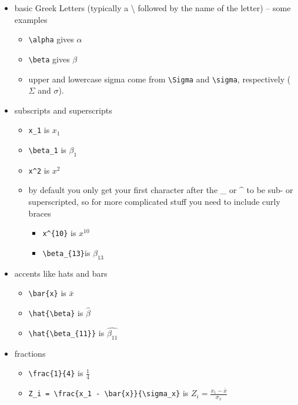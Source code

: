 \documentclass[
  letterpaper,
]{book}
\providecommand{\tightlist}{%
  \setlength{\itemsep}{0pt}\setlength{\parskip}{0pt}}\usepackage{longtable,booktabs,array}
\begin{document}
\begin{itemize}
\tightlist
\item
  basic Greek Letters (typically a \textbackslash{} followed by the name
  of the letter) -- some examples

  \begin{itemize}
  \tightlist
  \item
    \texttt{\textbackslash{}alpha} gives \(\alpha\)
  \item
    \texttt{\textbackslash{}beta} gives \(\beta\)
  \item
    upper and lowercase sigma come from \texttt{\textbackslash{}Sigma}
    and \texttt{\textbackslash{}sigma}, respectively (\(\Sigma\) and
    \(\sigma\)).
  \end{itemize}
\item
  subscripts and superscripts

  \begin{itemize}
  \tightlist
  \item
    \texttt{x\_1} is \(x_1\)
  \item
    \texttt{\textbackslash{}beta\_1} is \(\beta_1\)
  \item
    \texttt{x\^{}2} is \(x^2\)
  \item
    by default you only get your first character after the \_ or \^{} to
    be sub- or superscripted, so for more complicated stuff you need to
    include curly braces

    \begin{itemize}
    \tightlist
    \item
      \texttt{x\^{}\{10\}} is \(x^{10}\)
    \item
      \texttt{\textbackslash{}beta\_\{13\}}is \(\beta_{13}\)
    \end{itemize}
  \end{itemize}
\item
  accents like hats and bars

  \begin{itemize}
  \tightlist
  \item
    \texttt{\textbackslash{}bar\{x\}} is \(\bar{x}\)
  \item
    \texttt{\textbackslash{}hat\{\textbackslash{}beta\}} is
    \(\hat{\beta}\)
  \item
    \texttt{\textbackslash{}hat\{\textbackslash{}beta\_\{11\}\}} is
    \(\hat{\beta_{11}}\)
  \end{itemize}
\item
  fractions

  \begin{itemize}
  \tightlist
  \item
    \texttt{\textbackslash{}frac\{1\}\{4\}} is \(\frac{1}{4}\)
  \item
    \texttt{Z\_i\ =\ \textbackslash{}frac\{x\_1\ -\ \textbackslash{}bar\{x\}\}\{\textbackslash{}sigma\_x\}}
    is \(Z_i = \frac{x_1 - \bar{x}}{\sigma_x}\)
  \end{itemize}
\end{itemize}
\end{document}
